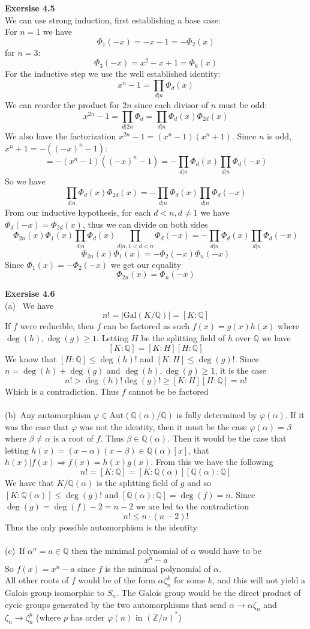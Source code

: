 \documentclass[12pt]{article}
\newenvironment{ques}[1]{\textbf{Exersise #1}\vspace{1 mm}\\ }{\bigskip}
\theoremstyle{definition}
\newcommand{\Q}{\mathbb Q}
\newcommand{\Z}{\mathbb Z}
\renewcommand{\a}{\alpha}
\renewcommand{\b}{\beta}
\newcommand{\Aut}{\text{Aut}}
\newcommand{\Gal}{\text{Gal}}
\begin{document}
\begin{ques}{4.5}
	We can use strong induction, first establishing a base case:\\
	For $n = 1$ we have
	$$\Phi_1(-x) = -x - 1 = -\Phi_2(x)$$
	for $n = 3$:
	$$\Phi_3(-x) = x^2 - x + 1 = \Phi_6(x)$$
	For the inductive step we use the well established identity:
	$$x^n - 1 = \prod_{d | n} \Phi_d(x)$$
	We can reorder the product for $2n$ since each divisor of $n$ must be odd:
	$$x^{2n} - 1 = \prod_{d|2n}\Phi_d = \prod_{d|n}\Phi_d(x) \Phi_{2d}(x) $$
	We also have the factorization $x^{2n} - 1 = (x^n - 1)(x^n + 1)$. Since $n$
	is odd, $x^n + 1 = -((-x)^n - 1)$:
	$$= -(x^n - 1)((-x)^n - 1) = -\prod_{d | n} \Phi_d(x)\prod_{d | n}
	\Phi_d(-x) $$
	So we have
	$$\prod_{d|n}\Phi_d(x) \Phi_{2d}(x) =-\prod_{d | n} \Phi_d(x)\prod_{d | n}
	\Phi_d(-x) $$
	From our inductive hypothesis, for each $d < n, d \neq 1$ we have
	$\Phi_d(-x) = \Phi_{2d}(x)$, thus we can divide on both sides
	$$\Phi_{2n}(x)\Phi_1(x)\prod_{d|n} \Phi_d(x) \prod_{d|n, 1 < d <
	n}\Phi_{d}(-x) =-\prod_{d | n} \Phi_d(x)\prod_{d | n} \Phi_d(-x) $$
	$$\Phi_{2n}(x)\Phi_1(x) = -\Phi_2(-x)\Phi_n(-x)$$
	Since $\Phi_1(x) = -\Phi_2(-x)$ we get our equality
	$$\Phi_{2n}(x) = \Phi_n(-x)$$
\end{ques}

\begin{ques}{4.6}
	(a) \ We have
	$$n! = |\Gal(K/\Q)| = [K:\Q]$$
	If $f$ were reducible, then $f$ can be factored as such $f(x) = g(x)h(x)$
	where $\deg(h),\deg(g) \geq 1$.
	Letting $H$ be the splitting field of $h$ over $\Q$ we have 
	$$[K:\Q] = [K:H][H:\Q]$$
	We know that $[H:\Q] \leq \deg(h)!$ and $[K:H] \leq \deg(g)!$. Since
	$n = \deg(h) + \deg(g)$ and $\deg(h),\deg(g) \geq 1$, it is the case
	$$n! > \deg(h)! \deg(g)! \geq [K:H][H:\Q] = n!$$
	Which is a contradiction. Thus $f$ cannot be be factored\\
	\\
	(b)\ Any automorphism $\varphi \in \Aut(\Q(\a)/\Q)$ is fully determined by
	$\varphi(\a)$. If it was the case that $\varphi$ was not the identity, then
	it must be the case $\varphi(\a) = \beta$ where $\beta \neq \a$ is a root of $f$.
	Thus $\beta \in \Q(\a)$. Then it would be the case that letting $h(x) =
	(x-\a)(x-\b) \in \Q(\a)[x]$, that $h(x)|f(x) \Rightarrow f(x) = h(x)g(x)$.
	From this we have the following
	$$n! = [K:\Q] = [K:\Q(\a)][\Q(\a):\Q]$$
	We have that $K/\Q(\a)$ is the splitting field of $g$ and so $[K:\Q(\a)]
	\leq \deg(g)!$ and $[\Q(\a):\Q] = \deg(f) = n$. Since $\deg(g) = \deg(f) -
	2 = n-2$ we are led to the contradiction
	$$n! \leq n \cdot (n-2)!$$
	Thus the only possible automorphism is the identity\\
	\\
	(c)\ If $\a^n = a\in \Q$ then the minimal polynomial of $\a$ would have to be 
	$$x^n - a$$
	So $f(x) = x^n - a$ since $f$ is the minimal polynomial of $\a$.\\
	All other roots of $f$ would be of the form $\a\zeta_n^k$ for some $k$, and
	this will not yield a Galois group isomorphic to $S_n$. The Galois group
	would be the direct product of cycic groups generated by the two automorphisms
	that send $\a \to \a\zeta_n$ and $\zeta_n \to \zeta_n^p$ (where $p$ has
	order $\varphi(n)$ in $(\Z/n)^*$)
\end{ques}
\end{document}
